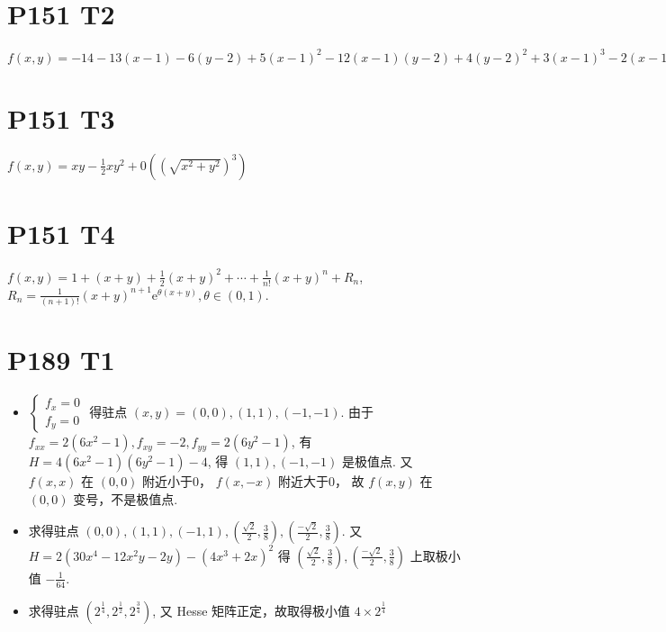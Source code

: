 \documentclass{article}
\begin{document}
\section*{P151 T2}

$f(x, y) = -14 - 13(x - 1) - 6(y - 2) + 5(x - 1)^2 - 12(x - 1)(y - 2) + 4(y - 2)^2 + 3(x - 1)^3 - 2(x - 1)^2(y - 2) - 2(x - 1)(y - 2)^2 + (y - 2)^3$

\section*{P151 T3}

$f(x, y) = xy - \frac{1}{2}xy^2 + 0\left(\left(\sqrt{x^2 + y^2}\right)^3\right)$

\section*{P151 T4}

$f(x, y) = 1 + (x + y) + \frac{1}{2}(x + y)^2 + \cdots + \frac{1}{n!}(x + y)^n + R_n$, $R_n = \frac{1}{(n + 1)!}(x + y)^{n + 1}\mathrm{e}^{\theta(x + y)}, \theta \in (0, 1)$.

\section*{P189 T1}

\begin{itemize}
    \item [(2)] $\begin{cases}
        f_x = 0 \\
        f_y = 0
    \end{cases}$ 得驻点 $(x, y) = (0, 0), (1, 1), (-1, -1)$. 由于 $f_{xx} = 2(6x^2 - 1), f_{xy} = -2, f_{yy} = 2(6y^2 - 1)$, 有 $H = 4(6x^2 - 1)(6y^2 - 1) - 4$, 得 $(1, 1), (-1, -1)$ 是极值点. 又 $f(x, x)$ 在 $(0, 0)$ 附近小于0， $f(x, -x)$ 附近大于0， 故 $f(x, y)$ 在 $(0, 0)$ 变号，不是极值点.
    \item [(4)] 求得驻点 $(0, 0), (1, 1), (-1, 1), \left(\frac{\sqrt{2}}{2}, \frac{3}{8}\right), \left(\frac{-\sqrt{2}}{2}, \frac{3}{8}\right)$. 又 $H = 2(30x^4 - 12x^2y - 2y) - (4x^3 + 2x)^2$ 得 $\left(\frac{\sqrt{2}}{2}, \frac{3}{8}\right), \left(\frac{-\sqrt{2}}{2}, \frac{3}{8}\right)$ 上取极小值 $-\frac{1}{64}$.
    \item [(6)] 求得驻点 $\left(2^\frac{1}{4}, 2^\frac{1}{2}, 2^\frac{3}{4}\right)$, 又 Hesse 矩阵正定，故取得极小值 $4\times 2^\frac{1}{4}$
\end{itemize}
\end{document}
